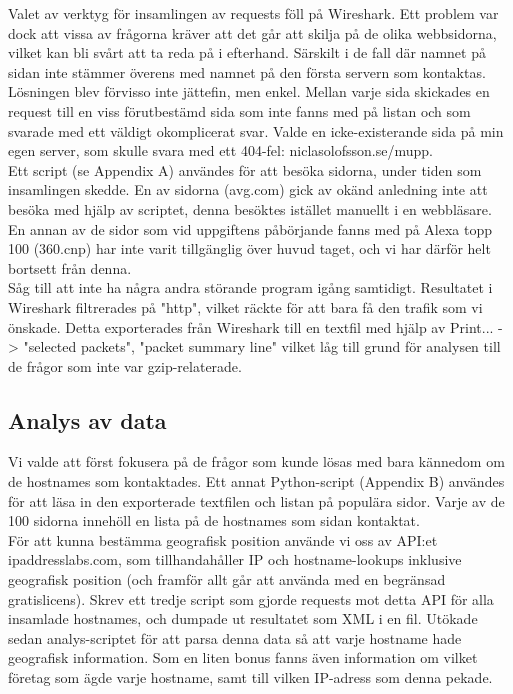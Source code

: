 \documentclass[a4paper]{article}
\begin{document}
Valet av verktyg för insamlingen av requests föll på Wireshark. Ett problem var dock att vissa av frågorna kräver att det går att skilja på de olika webbsidorna, vilket kan bli svårt att ta reda på i efterhand. Särskilt i de fall där namnet på sidan inte stämmer överens med namnet på den första servern som kontaktas. Lösningen blev förvisso inte jättefin, men enkel. Mellan varje sida skickades en request till en viss förutbestämd sida som inte fanns med på listan och som svarade med ett väldigt okomplicerat svar. Valde en icke-existerande sida på min egen server, som skulle svara med ett 404-fel: niclasolofsson.se/mupp.\\

Ett script (se Appendix A) användes för att besöka sidorna, under tiden som insamlingen skedde. En av sidorna (avg.com) gick av okänd anledning inte att besöka med hjälp av scriptet, denna besöktes istället manuellt i en webbläsare. En annan av de sidor som vid uppgiftens påbörjande fanns med på Alexa topp 100 (360.cnp) har inte varit tillgänglig över huvud taget, och vi har därför helt bortsett från denna.\\

Såg till att inte ha några andra störande program igång samtidigt. Resultatet i Wireshark filtrerades på "http", vilket räckte för att bara få den trafik som vi önskade. Detta exporterades från Wireshark till en textfil med hjälp av Print... -> "selected packets", "packet summary line" vilket låg till grund för analysen till de frågor som inte var gzip-relaterade.


\subsection{Analys av data}
Vi valde att först fokusera på de frågor som kunde lösas med bara kännedom om de hostnames som kontaktades. Ett annat Python-script (Appendix B) användes för att läsa in den exporterade textfilen och listan på populära sidor. Varje av de 100 sidorna innehöll en lista på de hostnames som sidan kontaktat.\\

För att kunna bestämma geografisk position använde vi oss av API:et ipaddresslabs.com, som tillhandahåller IP och hostname-lookups inklusive geografisk position (och framför allt går att använda med en begränsad gratislicens). Skrev ett tredje script som gjorde requests mot detta API för alla insamlade hostnames, och dumpade ut resultatet som XML i en fil. Utökade sedan analys-scriptet för att parsa denna data så att varje hostname hade geografisk information. Som en liten bonus fanns även information om vilket företag som ägde varje hostname, samt till vilken IP-adress som denna pekade.\\
\end{document}
